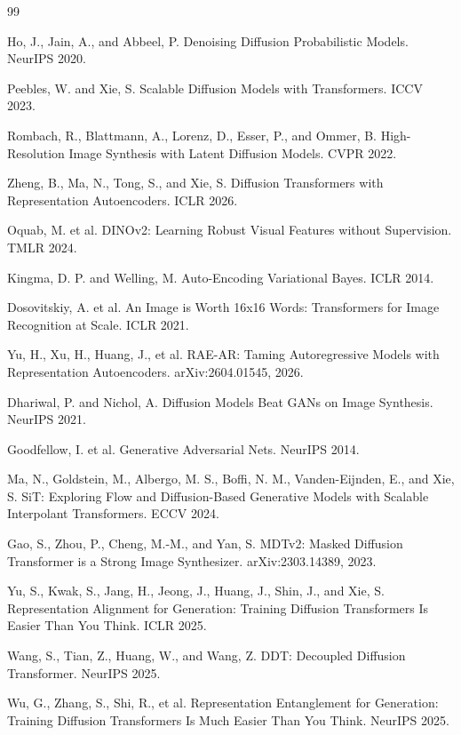 \documentclass[11pt]{article}
\begin{document}
\begin{thebibliography}{99}

Ho, J., Jain, A., and Abbeel, P. Denoising Diffusion Probabilistic Models. NeurIPS 2020.

Peebles, W. and Xie, S. Scalable Diffusion Models with Transformers. ICCV 2023.

Rombach, R., Blattmann, A., Lorenz, D., Esser, P., and Ommer, B. High-Resolution Image Synthesis with Latent Diffusion Models. CVPR 2022.

Zheng, B., Ma, N., Tong, S., and Xie, S. Diffusion Transformers with Representation Autoencoders. ICLR 2026.

Oquab, M. et al. DINOv2: Learning Robust Visual Features without Supervision. TMLR 2024.

Kingma, D. P. and Welling, M. Auto-Encoding Variational Bayes. ICLR 2014.

Dosovitskiy, A. et al. An Image is Worth 16x16 Words: Transformers for Image Recognition at Scale. ICLR 2021.

Yu, H., Xu, H., Huang, J., et al. RAE-AR: Taming Autoregressive Models with Representation Autoencoders. arXiv:2604.01545, 2026.

Dhariwal, P. and Nichol, A. Diffusion Models Beat GANs on Image Synthesis. NeurIPS 2021.

Goodfellow, I. et al. Generative Adversarial Nets. NeurIPS 2014.

Ma, N., Goldstein, M., Albergo, M. S., Boffi, N. M., Vanden-Eijnden, E., and Xie, S. SiT: Exploring Flow and Diffusion-Based Generative Models with Scalable Interpolant Transformers. ECCV 2024.

Gao, S., Zhou, P., Cheng, M.-M., and Yan, S. MDTv2: Masked Diffusion Transformer is a Strong Image Synthesizer. arXiv:2303.14389, 2023.

Yu, S., Kwak, S., Jang, H., Jeong, J., Huang, J., Shin, J., and Xie, S. Representation Alignment for Generation: Training Diffusion Transformers Is Easier Than You Think. ICLR 2025.

Wang, S., Tian, Z., Huang, W., and Wang, Z. DDT: Decoupled Diffusion Transformer. NeurIPS 2025.

Wu, G., Zhang, S., Shi, R., et al. Representation Entanglement for Generation: Training Diffusion Transformers Is Much Easier Than You Think. NeurIPS 2025.


\end{thebibliography}
\end{document}
